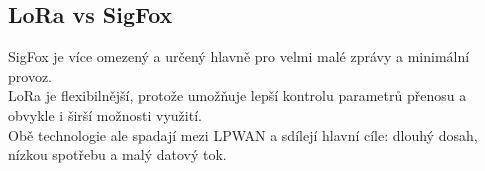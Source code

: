 \subsection{LoRa vs SigFox}
SigFox je více omezený a určený hlavně pro velmi malé zprávy a minimální provoz.\\
LoRa je flexibilnější, protože umožňuje lepší kontrolu parametrů přenosu a obvykle i širší možnosti využití.\\
Obě technologie ale spadají mezi LPWAN a sdílejí hlavní cíle: dlouhý dosah, nízkou spotřebu a malý datový tok.
